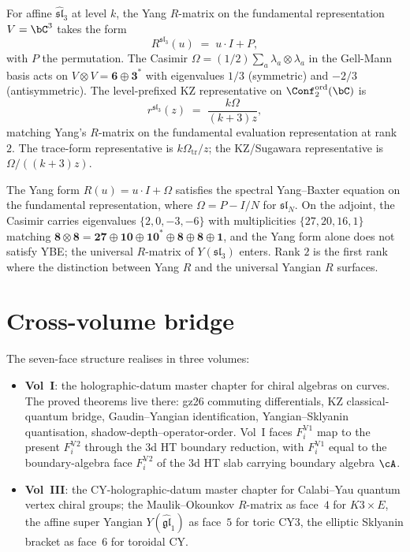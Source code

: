 \begin{computation}
\label{comp:dnp-master-sl3-yangian}
For affine $\widehat{\mathfrak{sl}}_3$ at level $k$, the Yang
$R$-matrix on the fundamental representation $V = \bC^3$ takes the form
\[
R^{\mathfrak{sl}_3}(u)
\;=\;
u\cdot I + P,
\]
with $P$ the permutation. The Casimir
$\Omega = (1/2)\sum_a \lambda_a\otimes\lambda_a$ in the Gell-Mann
basis acts on $V\otimes V = \mathbf{6}\oplus\mathbf{3}^*$ with
eigenvalues $1/3$ (symmetric) and $-2/3$ (antisymmetric). The
level-prefixed KZ representative on
$\Conf_2^{\mathrm{ord}}(\bC)$ is
\[
r^{\mathfrak{sl}_3}(z)
\;=\;
\frac{k\Omega}{(k+3) z},
\]
matching Yang's $R$-matrix on the fundamental evaluation
representation at rank $2$. The trace-form representative is
$k\Omega_{\mathrm{tr}}/z$; the KZ/Sugawara representative is $\Omega/((k+3)z)$.
\end{computation}

\begin{remark}
\label{rem:dnp-master-fund-adj}
The Yang form $R(u) = u\cdot I + \Omega$ satisfies the spectral
Yang--Baxter equation on the fundamental representation, where
$\Omega = P - I/N$ for $\mathfrak{sl}_N$. On the adjoint, the
Casimir carries eigenvalues $\{2,0,-3,-6\}$ with multiplicities
$\{27,20,16,1\}$ matching
$\mathbf{8}\otimes\mathbf{8} = \mathbf{27}\oplus\mathbf{10}\oplus
\mathbf{10}^*\oplus\mathbf{8}\oplus\mathbf{8}\oplus\mathbf{1}$,
and the Yang form alone does not satisfy YBE; the universal
$R$-matrix of $Y(\mathfrak{sl}_3)$ enters. Rank $2$ is the first
rank where the distinction between Yang $R$ and the universal
Yangian $R$ surfaces.
\end{remark}

\section{Cross-volume bridge}
\label{sec:dnp-master-cross-volume}

The seven-face structure realises in three volumes:
\begin{itemize}
\item \textbf{Vol~I}: the holographic-datum master chapter for
 chiral algebras on curves. The proved theorems live there:
 gz26 commuting differentials, KZ classical-quantum bridge,
 Gaudin--Yangian identification, Yangian--Sklyanin
 quantisation, shadow-depth--operator-order. Vol~I faces
 $F_i^{\mathrm{V1}}$ map to the present
 $F_i^{\mathrm{V2}}$ through the 3d HT boundary reduction,
 with $F_i^{\mathrm{V1}}$ equal to the boundary-algebra face
 $F_i^{\mathrm{V2}}$ of the 3d HT slab carrying boundary
 algebra $\cA$.
\item \textbf{Vol~III}: the CY-holographic-datum master chapter
 for Calabi--Yau quantum vertex chiral groups; the
 Maulik--Okounkov $R$-matrix as face~$4$ for $K3\times E$, the
 affine super Yangian $Y(\widehat{\mathfrak{gl}}_1)$ as
 face~$5$ for toric CY3, the elliptic Sklyanin bracket as
 face~$6$ for toroidal CY.
\end{itemize}

